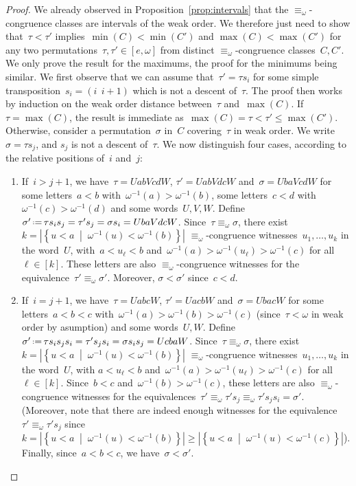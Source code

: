 \documentclass{amsart}
\theoremstyle{definition}
\newcommand{\set}[2]{\left\{ #1 \;\middle|\; #2 \right\}} %
\newcommand{\eqdef}{\mbox{\,\raisebox{0.2ex}{\scriptsize\ensuremath{\mathrm:}}\ensuremath{=}\,}} %
\begin{document}
\begin{proof}
We already observed in Proposition~\ref{prop:intervals} that the $\equiv_\omega$-congruence classes are intervals of the weak order. We therefore just need to show that~$\tau < \tau'$ implies~$\min(C) < \min(C')$ and $\max(C) < \max(C')$ for any two permutations~$\tau, \tau' \in [e,\omega]$ from distinct $\equiv_\omega$-congruence classes~$C,C'$. We only prove the result for the maximums, the proof for the minimums being similar. We first observe that we can assume that~$\tau' = \tau s_i$ for some simple transposition~${s_i = (i \;\, i+1)}$ which is not a descent of~$\tau$. The proof then works by induction on the weak order distance between~$\tau$ and~$\max(C)$. If~$\tau = \max(C)$, the result is immediate as~$\max(C) = \tau < \tau' \le \max(C')$. Otherwise, consider a permutation~$\sigma$ in~$C$ covering~$\tau$ in weak order. We write~$\sigma = \tau s_j$, and $s_j$ is not a descent of~$\tau$. We now distinguish four cases, according to the relative positions of~$i$ and~$j$:
\begin{enumerate}[(1)]
\item If~$i > j+1$, we have~$\tau = UabVcdW$, $\tau' = UabVdcW$ and~$\sigma = UbaVcdW$ for some letters~$a < b$ with~$\omega^{-1}(a) > \omega^{-1}(b)$, some letters~$c < d$ with~$\omega^{-1}(c) > \omega^{-1}(d)$ and some words~$U,V,W$. Define~$\sigma' \eqdef \tau s_i s_j = \tau' s_j = \sigma s_i = UbaVdcW$. Since~$\tau \equiv_\omega \sigma$, there exist $k = |\set{u < a}{\omega^{-1}(u) < \omega^{-1}(b)}|$ $\equiv_\omega$-congruence witnesses~$u_1, \dots, u_k$ in the word~$U$, with~$a < u_\ell < b$ and~$\omega^{-1}(a) > \omega^{-1}(u_\ell) > \omega^{-1}(c)$ for all~$\ell \in [k]$. These letters are also $\equiv_\omega$-congruence witnesses for the equivalence~$\tau' \equiv_\omega \sigma'$. Moreover, $\sigma < \sigma'$ since~$c < d$.
\item If~$i = j+1$, we have~$\tau = UabcW$, $\tau' = UacbW$ and~$\sigma = UbacW$ for some letters~${a < b < c}$ with~$\omega^{-1}(a) > \omega^{-1}(b) > \omega^{-1}(c)$ (since~$\tau < \omega$ in weak order by asumption) and some words~$U,W$. Define~$\sigma' \eqdef \tau s_i s_j s_i = \tau' s_j s_i = \sigma s_i s_j = UcbaW$. Since~$\tau \equiv_\omega \sigma$, there exist $k = |\set{u < a}{\omega^{-1}(u) < \omega^{-1}(b)}|$ $\equiv_\omega$-congruence witnesses~$u_1, \dots, u_k$ in the word~$U$, with ${a < u_\ell < b}$ and~$\omega^{-1}(a) > \omega^{-1}(u_\ell) > \omega^{-1}(c)$ for all~$\ell \in [k]$. Since~$b < c$ and~$\omega^{-1}(b) > \omega^{-1}(c)$, these letters are also $\equiv_\omega$-congruence witnesses for the equivalences~${\tau' \equiv_\omega \tau' s_j \equiv_\omega \tau' s_j s_i = \sigma'}$. (Moreover, note that there are indeed enough witnesses for the equivalence~$\tau' \equiv_\omega \tau' s_j$ since ${k = |\set{u < a}{\omega^{-1}(u) < \omega^{-1}(b)}| \ge |\set{u < a}{\omega^{-1}(u) < \omega^{-1}(c)}|}$). Finally, since~$a < b < c$, we have~$\sigma < \sigma'$.

\end{enumerate}
\end{proof}
\end{document}
